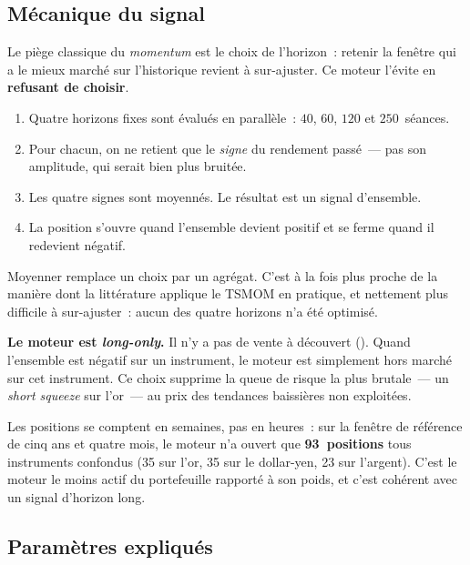 \documentclass[11pt, a4paper]{scrartcl}
\begin{document}
\subsection{Mécanique du signal}

Le piège classique du \emph{momentum} est le choix de l'horizon~: retenir la
fenêtre qui a le mieux marché sur l'historique revient à sur-ajuster. Ce moteur
l'évite en \textbf{refusant de choisir}.

\begin{enumerate}
\item Quatre horizons fixes sont évalués en parallèle~: $40$, $60$, $120$ et
      $250$~séances.
\item Pour chacun, on ne retient que le \emph{signe} du rendement passé~--- pas
      son amplitude, qui serait bien plus bruitée.
\item Les quatre signes sont moyennés. Le résultat est un signal d'ensemble.
\item La position s'ouvre quand l'ensemble devient positif et se ferme quand il
      redevient négatif.
\end{enumerate}

Moyenner remplace un choix par un agrégat. C'est à la fois plus proche de la
manière dont la littérature applique le TSMOM en pratique, et nettement plus
difficile à sur-ajuster~: aucun des quatre horizons n'a été optimisé.

\begin{insightbox}
\textbf{Le moteur est \emph{long-only}.} Il n'y a pas de vente à découvert
(). Quand l'ensemble est négatif sur un
instrument, le moteur est simplement hors marché sur cet instrument. Ce choix supprime la queue de risque la plus
brutale~--- un \emph{short squeeze} sur l'or~--- au prix des tendances baissières
non exploitées.
\end{insightbox}

Les positions se comptent en semaines, pas en heures~: sur la fenêtre de
référence de cinq ans et quatre mois, le moteur n'a ouvert que \textbf{93~positions}
tous instruments confondus (35 sur l'or, 35 sur le dollar-yen, 23 sur l'argent).
C'est le moteur le moins actif du portefeuille rapporté à son poids, et c'est
cohérent avec un signal d'horizon long.

\subsection{Paramètres expliqués}
\end{document}
